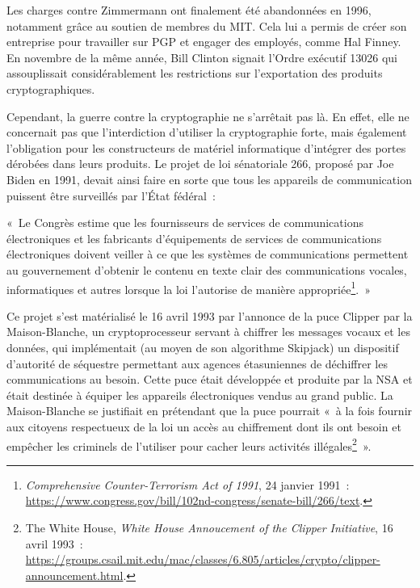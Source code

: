 \documentclass[
  a5paper,
  smalldemyvopaper,10pt,twoside,onecolumn,openright,extrafontsizes,hidelinks]{memoir}
\begin{document}
Les charges contre Zimmermann ont finalement été abandonnées en 1996,
notamment grâce au soutien de membres du MIT. Cela lui a permis de créer
son entreprise pour travailler sur PGP et engager des employés, comme
Hal Finney. En novembre de la même année, Bill Clinton signait l'Ordre
exécutif 13026 qui assouplissait considérablement les restrictions sur
l'exportation des produits cryptographiques.

Cependant, la guerre contre la cryptographie ne s'arrêtait pas là. En
effet, elle ne concernait pas que l'interdiction d'utiliser la
cryptographie forte, mais également l'obligation pour les constructeurs
de matériel informatique d'intégrer des portes dérobées dans leurs
produits. Le projet de loi sénatoriale 266, proposé par Joe Biden en
1991, devait ainsi faire en sorte que tous les appareils de
communication puissent être surveillés par l'État fédéral~:

«~Le Congrès estime que les fournisseurs de services de communications
électroniques et les fabricants d'équipements de services de
communications électroniques doivent veiller à ce que les systèmes de
communications permettent au gouvernement d'obtenir le contenu en texte
clair des communications vocales, informatiques et autres lorsque la loi
l'autorise de manière appropriée\footnote{\emph{Comprehensive
  Counter-Terrorism Act of 1991}, 24 janvier 1991~:
  \url{https://www.congress.gov/bill/102nd-congress/senate-bill/266/text}.}.~»

Ce projet s'est matérialisé le 16 avril 1993 par l'annonce de la puce
Clipper par la Maison-Blanche, un cryptoprocesseur servant à chiffrer
les messages vocaux et les données, qui implémentait (au moyen de son
algorithme Skipjack) un dispositif d'autorité de séquestre permettant
aux agences étasuniennes de déchiffrer les communications au besoin.
Cette puce était développée et produite par la NSA et était destinée à
équiper les appareils électroniques vendus au grand public. La
Maison-Blanche se justifiait en prétendant que la puce pourrait «~à la
fois fournir aux citoyens respectueux de la loi un accès au chiffrement
dont ils ont besoin et empêcher les criminels de l'utiliser pour cacher
leurs activités illégales\footnote{The White House, \emph{White House
  Annoucement of the Clipper Initiative}, 16 avril 1993~:
  \url{https://groups.csail.mit.edu/mac/classes/6.805/articles/crypto/clipper-announcement.html}.}~».
\end{document}
